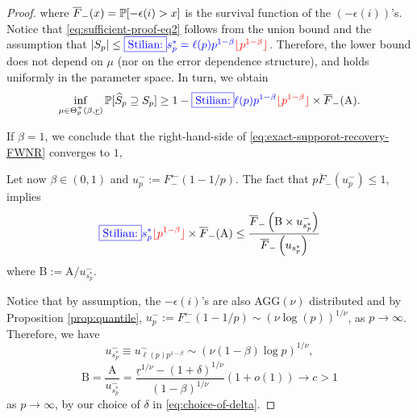 \begin{proof}
where $\overline{F}_-(x) = \P[-\epsilon(i)>x]$ is the survival function of the $(-\epsilon(i))$'s.
Notice that \eqref{eq:sufficient-proof-eq2} follows from the union bound and the assumption that ${|S_p|}\le \stilian{s_p^*= \ell(p)p^{1-\beta}}{{\lfloor p^{1-\beta}\rfloor}}$. 
Therefore, the lower bound does not depend on $\mu$ (nor on the error dependence structure), and holds uniformly in the parameter space. In turn, we obtain 
\begin{equation} \label{eq:exact-supporot-recovery-FWNR}
    \inf_{\mu\in\Theta_p^+(\beta, \underline{r})} \P[\widehat{S}_p \supseteq S_p] \ge 1 - \stilian{\ell(p)p^{1-\beta}}{\lfloor p^{1-\beta} \rfloor} \times \overline{F}_-(\text{A}).
\end{equation}

If $\beta=1$, we conclude that the right-hand-side of \eqref{eq:exact-supporot-recovery-FWNR} 
converges to $1$, 

Let now $\beta\in (0,1)$ and $u_p^- :=  F_-^{\leftarrow}(1-1/p)$. 
The fact that $p\overline{F}_-(u_p^-) \le 1$, implies
\begin{equation}
    \stilian{s_p^*}{\lfloor p^{1-\beta} \rfloor} \times \overline{F}_-(\text{A}) \le 
    \frac{\overline{F}_-\left(\text{B}\times{u_{s_p^*}^-}\right)} {\overline{F}_-\left({u_{s_p^*}}\right)} \label{eq:sufficient-proof-eq3}
\end{equation}
where $\text{B} := {\text{A}}/{u_{s_p^*}^-}$.

Notice that by assumption, the $-\epsilon(i)$'s are also 
AGG$(\nu)$ distributed and by Proposition \ref{prop:quantile}, 
$u_p^{-}:= F_-^{\leftarrow}(1-1/p) \sim (\nu \log(p))^{1/\nu}$,
as $p\to\infty$. Therefore, we have
\begin{equation} \label{eq:sufficient-proof-eq4}
    u_{s_p^*}^- \equiv u_{\ell(p)p^{1-\beta}}^-\sim \left(\nu(1-\beta)\log{p}\right)^{1/\nu},
\end{equation}
\begin{equation*}
\text{B} = \frac{\text{A}}{u_{s_p^*}^-}
= \frac{\underline{r}^{1/\nu} - (1+\delta)^{1/\nu}}{(1-\beta)^{1/\nu}}\left(1+o(1)\right) \to c>1
\end{equation*}
as $p\to\infty$, by our choice of $\delta$ in \eqref{eq:choice-of-delta}.


\end{proof}
